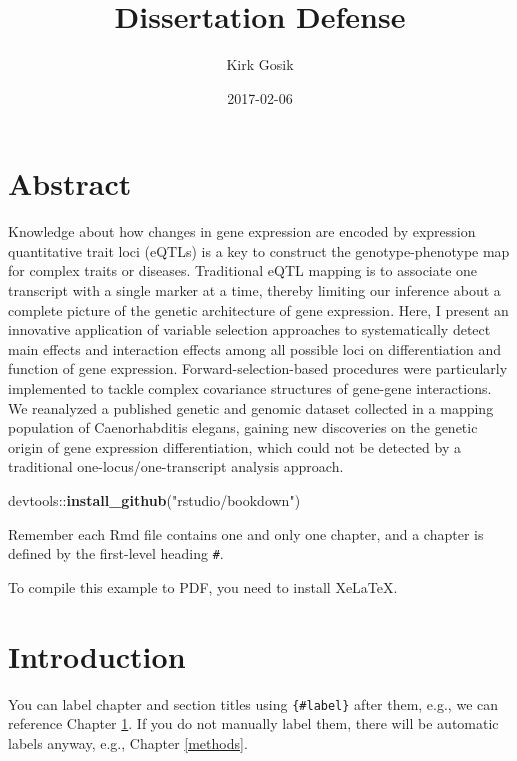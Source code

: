 \documentclass[]{book}
\title{Dissertation Defense}
\author{Kirk Gosik}
\date{2017-02-06}
\newenvironment{Shaded}{\begin{snugshade}}{\end{snugshade}}
\newcommand{\KeywordTok}[1]{\textcolor[rgb]{0.13,0.29,0.53}{\textbf{{#1}}}}
\newcommand{\StringTok}[1]{\textcolor[rgb]{0.31,0.60,0.02}{{#1}}}
\newcommand{\NormalTok}[1]{{#1}}
\theoremstyle{definition}
\theoremstyle{definition}
\theoremstyle{remark}
\begin{document}
\maketitle

{
\setcounter{tocdepth}{1}
\tableofcontents
}
\chapter*{Abstract}\label{abstract}

Knowledge about how changes in gene expression are encoded by expression
quantitative trait loci (eQTLs) is a key to construct the
genotype-phenotype map for complex traits or diseases. Traditional eQTL
mapping is to associate one transcript with a single marker at a time,
thereby limiting our inference about a complete picture of the genetic
architecture of gene expression. Here, I present an innovative
application of variable selection approaches to systematically detect
main effects and interaction effects among all possible loci on
differentiation and function of gene expression. Forward-selection-based
procedures were particularly implemented to tackle complex covariance
structures of gene-gene interactions. We reanalyzed a published genetic
and genomic dataset collected in a mapping population of Caenorhabditis
elegans, gaining new discoveries on the genetic origin of gene
expression differentiation, which could not be detected by a traditional
one-locus/one-transcript analysis approach.

\begin{Shaded}
\begin{Highlighting}[]
\NormalTok{devtools::}\KeywordTok{install_github}\NormalTok{(}\StringTok{"rstudio/bookdown"}\NormalTok{)}
\end{Highlighting}
\end{Shaded}

Remember each Rmd file contains one and only one chapter, and a chapter
is defined by the first-level heading \texttt{\#}.

To compile this example to PDF, you need to install XeLaTeX.

\chapter{Introduction}\label{intro}

You can label chapter and section titles using \texttt{\{\#label\}}
after them, e.g., we can reference Chapter \ref{intro}. If you do not
manually label them, there will be automatic labels anyway, e.g.,
Chapter \ref{methods}.
\end{document}

